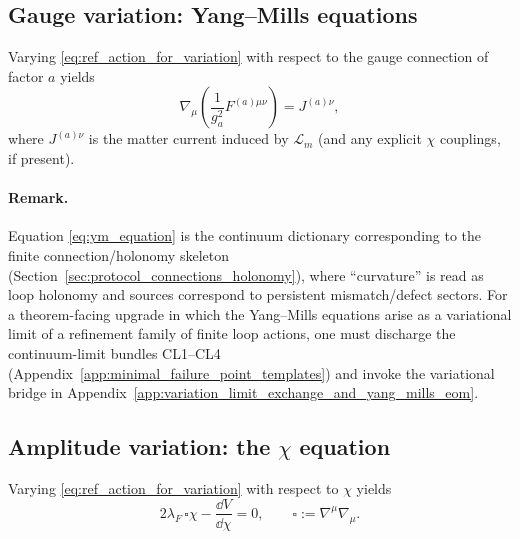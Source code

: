 \subsection{Gauge variation: Yang--Mills equations}
\label{subsec:ym_equations_variation}

\begin{proposition}
\label{prop:ym_equation}
Varying \eqref{eq:ref_action_for_variation} with respect to the gauge connection of factor $a$ yields
\begin{equation}
\label{eq:ym_equation}
\nabla_\mu\left(\frac{1}{g_a^2}F^{(a)\mu\nu}\right)=J^{(a)\nu},
\end{equation}
where $J^{(a)\nu}$ is the matter current induced by $\mathcal{L}_m$ (and any explicit $\chi$ couplings, if present).
\end{proposition}

\paragraph{Remark.}
\InterfaceTag Equation \eqref{eq:ym_equation} is the continuum dictionary corresponding to the finite connection/holonomy skeleton (Section~\ref{sec:protocol_connections_holonomy}), where ``curvature'' is read as loop holonomy and sources correspond to persistent mismatch/defect sectors.
\AuditTag For a theorem-facing upgrade in which the Yang--Mills equations arise as a variational limit of a refinement family of finite loop actions, one must discharge the continuum-limit bundles CL1--CL4 (Appendix~\ref{app:minimal_failure_point_templates}) and invoke the variational bridge in Appendix~\ref{app:variation_limit_exchange_and_yang_mills_eom}.

\subsection{Amplitude variation: the \texorpdfstring{$\chi$}{chi} equation}
\label{subsec:chi_equation_variation}

\begin{proposition}
\label{prop:chi_eom}
Varying \eqref{eq:ref_action_for_variation} with respect to $\chi$ yields
\begin{equation}
\label{eq:chi_eom}
2\lambda_F\,\square\chi-\frac{\dd V}{\dd\chi}=0,
\qquad \square:=\nabla^\mu\nabla_\mu.
\end{equation}
\end{proposition}

